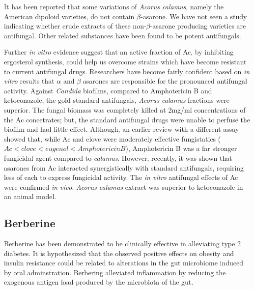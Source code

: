 \documentclass[twocolumn]{article}
\begin{document}
It has been reported that some variations of \textit{Acorus calamus},
namely the American dipoloid varieties,
do not contain $\beta$-asarone.
\cite{phongpaichit2005antimicrobial}
We have not seen a study indicating whether crude extracts
of these non-$\beta$-asarone producing varieties are antifungal.
Other related substances have been found to be potent antifungals.
\cite{rajput2013anti}

Further \textit{in vitro} evidence suggest that
an active fraction of Ac,
by inhibiting ergosterol synthesis,
could help us overcome strains which have become
resistant to current antifungal drugs.
\cite{
subha2008effect,
subha2009vitro
}
Researchers have become fairly confident based on \textit{in vitro}
results that $\alpha$ and $\beta$ asarones are responsible for
the pronounced antifungal activity.
\cite{devi2009antimicrobial}
Against \textit{Candida} biofilms,
compared to Amphotericin B and ketoconazole, the gold-standard antifungals,
\textit{Acorus calamus} fractions were superior.
The fungal biomass was completely killed at 2mg/ml concentrations
of the Ac concetrates; but, the standard antifungal drugs
were unable to perfuse the biofilm and had little effect.
\cite{subha2009candida}
Although, an earlier review with a different assay
showed that, while Ac and clove were moderately effective fungistatics
($Ac < clove < eugenol < Amphotericin B$),
Amphotericin B was a far stronger fungicidal agent
compared to \textit{calamus}.
\cite{thirach2003antifungal}
However, recently,
it was shown that asarones from Ac interacted
synergistically with standard antifungals,
requiring less of each to express fungicidal activity.
\cite{kumar2015asarones}
The \textit{in vitro} antifungal effects of Ac
were confirmed \textit{in vivo}.
\textit{Acorus calamus} extract
was superior to ketoconazole in an animal model.
\cite{subha2009combating}








\subsection{Berberine}


Berberine has been demonstrated to be clinically effective
in alleviating type 2 diabetes.
It is hypothesized that the observed positive effects
on obesity and insulin resistance could be related
to alterations in the gut microbiome induced by oral adminstration.
Berbering alleviated inflammation by reducing the exogenous antigen load
produced by the microbiota of the gut.
\cite{zhang2012structural}
\end{document}
